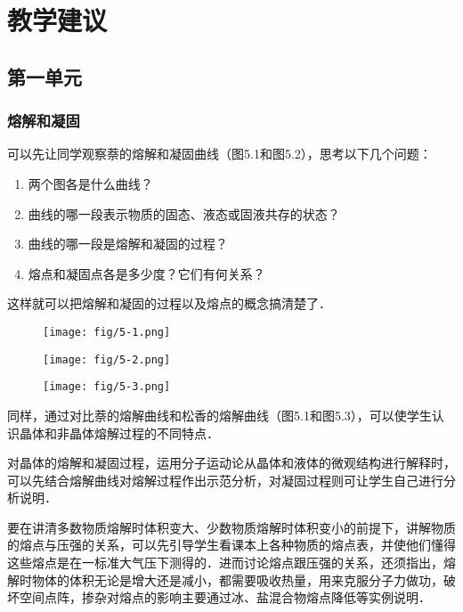 \section{教学建议}
\subsection{第一单元}
\subsubsection{熔解和凝固} 

可以先让同学观察萘的熔解和凝固曲线（图5.1和图5.2），思考以下几个问题：
\begin{enumerate}
\item 两个图各是什么曲线？    \item 曲线的哪一段表示物质的固态、液态或固液共存的状态？    \item 曲线的哪一段是熔解和凝固的过程？    \item 熔点和凝固点各是多少度？它们有何关系？
\end{enumerate}
这样就可以把熔解和凝固的过程以及熔点的概念搞清楚了．
\begin{figure}[htp]\centering
    \begin{minipage}[t]{0.31\textwidth}
    \centering
    \texttt{[image: fig/5-1.png]}
    \caption{}
    \end{minipage}
    \begin{minipage}[t]{0.31\textwidth}
    \centering
    \texttt{[image: fig/5-2.png]}
    \caption{}
    \end{minipage}
    \begin{minipage}[t]{0.31\textwidth}
        \centering
        \texttt{[image: fig/5-3.png]}
        \caption{}
        \end{minipage}
    \end{figure}

同样，通过对比萘的熔解曲线和松香的熔解曲线（图5.1和图5.3），可以使学生认识晶体和非晶体熔解过程的不同特点．

对晶体的熔解和凝固过程，运用分子运动论从晶体和液体的微观结构进行解释时，可以先结合熔解曲线对熔解过程作出示范分析，对凝固过程则可让学生自己进行分析说明．

要在讲清多数物质熔解时体积变大、少数物质熔解时体积变小的前提下，讲解物质的熔点与压强的关系，可以先引导学生看课本上各种物质的熔点表，并使他们懂得这些熔点是在一标准大气压下测得的．进而讨论熔点跟压强的关系，还须指出，熔解时物体的体积无论是增大还是减小，都需要吸收热量，用来克服分子力做功，破坏空间点阵，掺杂对熔点的影响主要通过冰、盐混合物熔点降低等实例说明．

